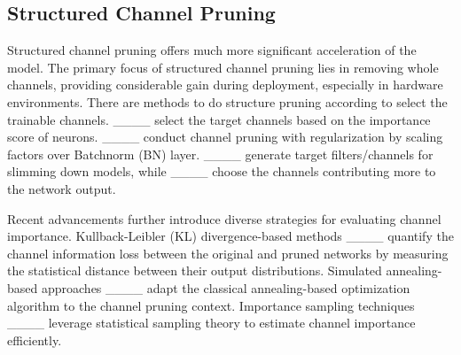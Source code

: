 \subsection{Structured Channel Pruning} 
Structured channel pruning offers much more significant acceleration of the model. The primary focus of structured channel pruning lies in removing whole channels, providing considerable gain during deployment, especially in hardware environments. 
There are methods to do structure pruning according to select the trainable channels. ____ select the target channels based on the importance score of neurons. ____ conduct channel pruning with regularization by scaling factors over Batchnorm (BN) layer. ____ generate target filters/channels for slimming down models, while ____ choose the channels contributing more to the network output. 

Recent advancements further introduce diverse strategies for evaluating channel importance. 
Kullback-Leibler (KL) divergence-based methods ____ quantify the channel information loss between the original and pruned networks by measuring the statistical distance between their output distributions.
Simulated annealing-based approaches ____ adapt the classical annealing-based optimization algorithm to the channel pruning context. Importance sampling techniques ____ leverage statistical sampling theory to estimate channel importance efficiently.




